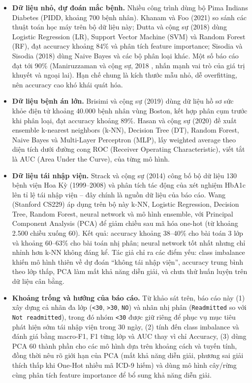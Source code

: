 \documentclass[a4paper]{report}
\begin{document}
\begin{itemize}
  \item \textbf{Dữ liệu nhỏ, dự đoán mắc bệnh.} Nhiều công trình dùng bộ Pima Indians Diabetes (PIDD, khoảng 700 bệnh nhân). Khanam và Foo (2021) \cite{tl1} so sánh các thuật toán học máy trên bộ dữ liệu này; Dutta và cộng sự (2018) \cite{tl4} dùng Logistic Regression (LR), Support Vector Machine (SVM) và Random Forest (RF), đạt accuracy khoảng 84\% và phân tích feature importance; Sisodia và Sisodia (2018) \cite{tl5} dùng Naive Bayes và các bộ phân loại khác. Một số báo cáo đạt tới 90\% (Maniruzzaman và cộng sự, 2018 \cite{tl2}, nhấn mạnh vai trò của giá trị khuyết và ngoại lai). Hạn chế chung là kích thước mẫu nhỏ, dễ overfitting, nên accuracy cao khó khái quát hóa.

  \item \textbf{Dữ liệu bệnh án lớn.} Brisimi và cộng sự (2019) \cite{tl3} dùng dữ liệu hồ sơ sức khỏe điện tử khoảng 40.000 bệnh nhân vùng Boston, kết hợp phân cụm trước khi phân loại, đạt accuracy khoảng 89\%. Hasan và cộng sự (2020) \cite{tl6} đề xuất ensemble k-nearest neighbors (k-NN), Decision Tree (DT), Random Forest, Naive Bayes và Multi-Layer Perceptron (MLP), lấy weighted average theo diện tích dưới đường cong ROC (Receiver Operating Characteristic), viết tắt là AUC (Area Under the Curve), của từng mô hình.

  \item \textbf{Dữ liệu tái nhập viện.} Strack và cộng sự (2014) \cite{tl7} công bố bộ dữ liệu 130 bệnh viện Hoa Kỳ (1999–2008) và phân tích tác động của xét nghiệm HbA1c lên tỉ lệ tái nhập viện – đây chính là nguồn dữ liệu của báo cáo. Wang (Stanford CS229) \cite{tl8} áp dụng trên bộ này k-NN, Logistic Regression, Decision Tree, Random Forest, neural network và mô hình ensemble, với Principal Component Analysis (PCA) để giảm chiều sau mã hóa one-hot (từ khoảng 2.500 chiều xuống 60). Kết quả: accuracy khoảng 38–40\% cho bài toán 3 lớp và khoảng 60–63\% cho bài toán nhị phân; neural network tốt nhất nhưng chỉ nhỉnh hơn k-NN không đáng kể. Tác giả chỉ ra các điểm yếu: class imbalance khiến mô hình thiên về dự đoán “không tái nhập viện”, accuracy trung bình theo lớp thấp, PCA làm mất khả năng diễn giải, và chưa thử huấn luyện trên dữ liệu cân bằng.

  \item \textbf{Khoảng trống và hướng của báo cáo.} Từ khảo sát trên, báo cáo này (1) xây dựng cả nhãn đa lớp (\texttt{<30}, \texttt{>30}, \texttt{NO}) và nhãn nhị phân (\texttt{Readmitted} so với \texttt{Not readmitted}), trong đó nhóm \texttt{<30} được giữ riêng để phục vụ mục tiêu phát hiện sớm tái nhập viện trong 30 ngày, (2) tính đến class imbalance và đánh giá bằng macro-F1, F1 từng lớp và AUC thay vì chỉ Accuracy, (3) dùng PCA 60 thành phần cho các mô hình dựa trên khoảng cách và tuyến tính, đồng thời nêu rõ giới hạn của PCA (mất khả năng diễn giải, phương sai giải thích thấp khi One-Hot nhiều mã ICD-9 hiếm) và dùng mô hình cây/rừng cùng phân tích feature importance để bổ sung khả năng diễn giải.
\end{itemize}
\end{document}
